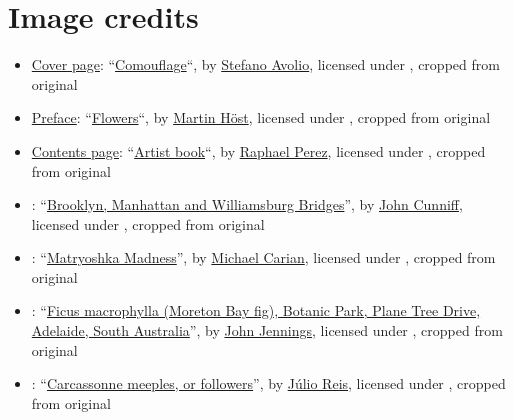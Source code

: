 


\chapter{Image credits}

\begin{itemize}

\item \hyperlink{page.i}{Cover page}: ``\href{https://www.flickr.com/photos/savolio/43652503821/}{Comouflage}``, by \href{https://www.flickr.com/people/savolio/}{Stefano Avolio}, licensed under , cropped from original

\item \hyperlink{page.ii}{Preface}: ``\href{https://www.flickr.com/photos/martin_l_h/34514200226/}{Flowers}``, by \href{https://www.flickr.com/people/martin_l_h/}{Martin Höst}, licensed under , cropped from original

\item \hyperlink{page.iii}{Contents page}: ``\href{https://www.flickr.com/photos/naivepaintings/43496736484/}{Artist book}``, by \href{https://www.flickr.com/people/naivepaintings/}{Raphael Perez}, licensed under , cropped from original

\item {}:
``\href{https://www.flickr.com/photos/johncunniff/19486177769/}{Brooklyn, Manhattan and Williamsburg Bridges}'', by \href{https://www.flickr.com/photos/johncunniff/}{John Cunniff}, licensed under , cropped from original

\item {}: ``\href{https://www.flickr.com/photos/carianoff/4484964103/}{Matryoshka Madness}'', by \href{https://www.flickr.com/photos/carianoff/}{Michael Carian}, licensed under , cropped from original

\item {}: ``\href{https://www.flickr.com/photos/124930081@N08/31594099295/}{Ficus macrophylla (Moreton Bay fig), Botanic Park, Plane Tree Drive, Adelaide, South Australia}'', by \href{https://www.flickr.com/photos/124930081@N08/}{John Jennings}, licensed under , cropped from original

\item {}: ``\href{https://commons.wikimedia.org/wiki/File:Carcassonne_Miples.jpg}{Carcassonne meeples, or followers}'', by \href{https://commons.wikimedia.org/wiki/User:Tintazul}{Júlio Reis}, licensed under , cropped from original


\end{itemize}
